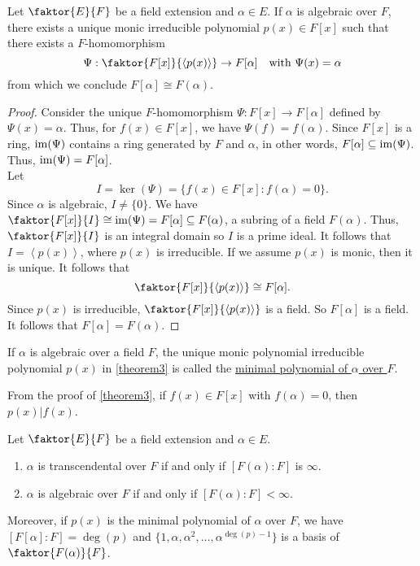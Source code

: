 \documentclass[11pt]{article}
\newcommand{\cyclic}[1]{\left\langle #1 \right\rangle}
\newcommand{\quotient}[2]{\faktor{#1}{#2}}
\begin{document}
\begin{theorem} \label{theorem3}
Let $\quotient{E}{F}$ be a field extension and $\alpha \in E$. If $\alpha$ is
algebraic over $F$, there exists a unique monic irreducible polynomial $p(x) \in
F[x]$ such that there exists a $F$-homomorphism
\begin{equation*}
\Psi:\quotient{F[x]}{\cyclic{p(x)}} \to F[\alpha] \quad \text{with } \Psi(x) =
\alpha
\end{equation*}
from which we conclude $F[\alpha] \cong F(\alpha)$.
\end{theorem}
\begin{proof}
Consider the unique $F$-homomorphism $\Psi: F[x] \to F[\alpha]$ defined by
$\Psi(x) = \alpha$. Thus, for $f(x) \in F[x]$, we have $\Psi(f) = f(\alpha)$.
Since $F[x]$ is a ring, $\operatorname{im}(\Psi)$ contains a ring generated by $F$ and
$\alpha$, in other words, $F[\alpha] \subseteq \operatorname{im}(\Psi)$. Thus, $\operatorname{im}(\Psi) =
F[\alpha]$.\\
Let
\begin{equation*}
I = \ker(\Psi) = \{f(x) \in F[x] : f(\alpha) = 0 \}.
\end{equation*}
Since $\alpha$ is algebraic, $I \neq \{0\}$. We have $\quotient{F[x]}{I} \cong
\im(\Psi) = F[\alpha] \subseteq F(\alpha)$, a subring of a field $F(\alpha)$.
Thus, $\quotient{F[x]}{I}$ is an integral domain so $I$ is a prime ideal. It
follows that $I = \cyclic{p(x)}$, where $p(x)$ is irreducible. If we assume
$p(x)$ is monic, then it is unique. It follows that
\begin{equation*}
\quotient{F[x]}{\cyclic{p(x)}}\cong F[\alpha].
\end{equation*}
Since $p(x)$ is irreducible, $\quotient{F[x]}{\cyclic{p(x)}}$ is a field. So
$F[\alpha]$ is a field. It follows that $F[\alpha] = F(\alpha)$.
\end{proof}
\begin{definition}
If $\alpha$ is algebraic over a field $F$, the unique monic polynomial
irreducible polynomial $p(x)$ in \cref{theorem3} is called the
\underline{minimal polynomial of $\alpha$ over $F$}.
\end{definition}
\begin{remark}
From the proof of \cref{theorem3}, if $f(x) \in F[x]$ with $f(\alpha) = 0$, then
$p(x) \big| f(x)$.
\end{remark}
\begin{theorem} \label{theorem4}
Let $\quotient{E}{F}$ be a field extension and $\alpha \in E$.
\begin{enumerate}
\item $\alpha$ is transcendental over $F$ if and only if $[F(\alpha):F]$ is
$\infty$.
\item $\alpha$ is algebraic over $F$ if and only if $[F(\alpha):F] < \infty$.
\end{enumerate}
Moreover, if $p(x)$ is the minimal polynomial of $\alpha$ over $F$, we have
$[F[\alpha]:F] = \deg(p)$ and $\{1, \alpha, \alpha^2, \dots,
\alpha^{\deg (p) - 1}\}$ is a basis of $\quotient{F(\alpha)}{F}$.
\end{theorem}
\end{document}
